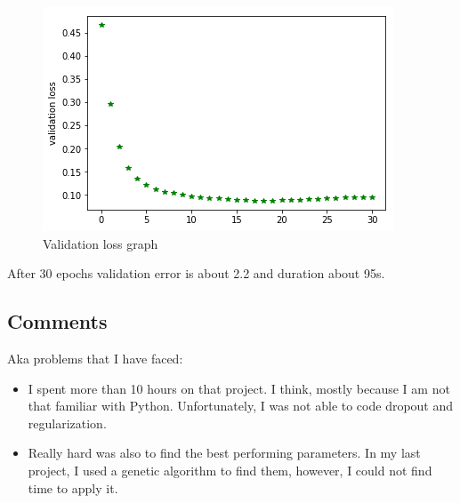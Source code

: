 \documentclass{scrartcl}
\begin{document}
\begin{figure}[H]
	\centering
	\includegraphics[scale=0.6]{validation_loss}
	\caption{Validation loss graph}
	\label{fig:validationLost}
\end{figure}

After 30 epochs validation error is about 2.2 and duration about 95s.

\subsection*{Comments}
Aka problems that I have faced:
\begin{itemize}
	\item I spent more than 10 hours on that project. I think, mostly because I am not that familiar with Python. Unfortunately, I was not able to code dropout and regularization. 
	\item Really hard was also to find the best performing parameters. In my last project, I used a genetic algorithm to find them, however, I could not find time to apply it.
\end{itemize}
\end{document}
